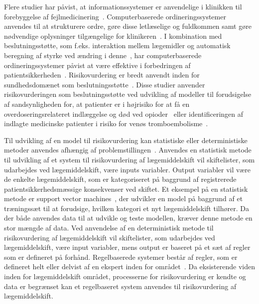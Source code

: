 Flere studier har påvist, at informationssystemer er anvendelige i klinikken til forebyggelse af fejlmedicinering~\citep{Agrawal2009,  Stenner2010, Fischer2008, Simpson2008, Kaushal2002, Bates2000a}. Computerbaserede ordineringssystemer anvendes til at strukturere ordre, gøre disse letlæselige og fuldkommen samt gøre nødvendige oplysninger tilgængelige for klinikeren~\citep{Agrawal2009,Bates2000a}. I kombination med beslutningsstøtte, som f.eks. interaktion mellem lægemidler og automatisk beregning af styrke ved ændring i denne~\citep{Agrawal2009}, har computerbaserede ordineringssystemer påvist at være effektive i forbedringen af patientsikkerheden~\citep{Agrawal2009, Bates2000a}. Risikovurdering er bredt anvendt inden for sundhedsdomænet som beslutningsstøtte~\citep{Geissert2018, Rawshani2018,Barbar2010}. Disse studier anvender risikovurderingen som beslutningsstøtte ved udvikling af modeller til forudsigelse af sandsynligheden for, at patienter er i højrisiko for at få en overdoseringsrelateret indlæggelse og død ved opioder~\citep{Geissert2018} eller identificeringen af indlagte medicinske patienter i risiko for venøs tromboembolisme~\citep{Barbar2010}.

Til udvikling af en model til risikovurdering kan statistiske eller deterministiske metoder anvendes afhængig af problemstillingen~\citep{Boyko1990,Kirchsteiger1999}. Anvendes en statistisk metode til udvikling af et system til risikovurdering af lægemiddelskift vil skiftelister, som udarbejdes ved lægemiddelskift, være inputs variabler. Output variabler vil være de enkelte lægemiddelskift, som er kategoriseret på baggrund af registrerede patientsikkerhedsmæssige konsekvenser ved skiftet. Et eksempel på en statistisk metode er support vector machines~\citep{Koivu2018}, der udvikler en model på baggrund af et træningssæt til at forudsige, hvilken kategori et nyt lægemiddelskift tilhører. Da der både anvendes data til at udvikle og teste modellen, kræver denne metode en stor mængde af data. Ved anvendelse af en deterministisk metode til risikovurdering af lægemiddelskift vil skiftelister, som udarbejdes ved lægemiddelskift, være input variabler, mens output er baseret på et sæt af regler som er defineret på forhånd. Regelbaserede systemer består af regler, som er defineret helt eller delvist af en ekspert inden for området~\citep{Crina2008}. Da eksisterende viden inden for lægemiddelskift området, processerne for risikovurdering er kendte og data er begrænset kan et regelbaseret system anvendes til risikovurdering af lægemiddelskift. 

